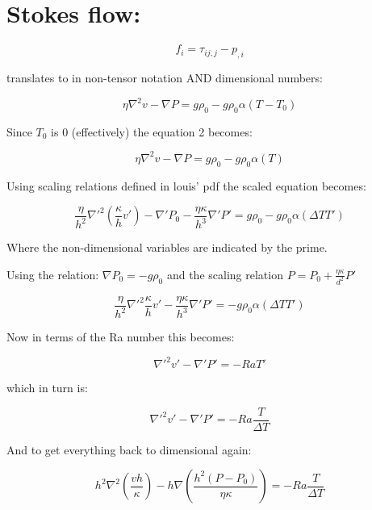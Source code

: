 \documentclass[a4paper]{article}
\begin{document}
\section{Stokes flow:}

\begin{equation}f_i = \tau_{ij,j} - p_{,i}\end{equation}

translates to in non-tensor notation AND dimensional numbers:

\begin{equation}\eta \nabla^2 v - \nabla P =  g \rho_0 - g\rho_0 \alpha(T - T_0)\end{equation} 

Since $T_0$ is 0 (effectively) the equation 2 becomes:

\begin{equation}\eta \nabla^2 v - \nabla P =  g \rho_0 - g\rho_0 \alpha(T)\end{equation} 

Using scaling relations defined in louis' pdf the scaled equation becomes:

\begin{equation}\frac{\eta}{h^2} \nabla'^2 (\frac{\kappa}{h}v') - \nabla' P_0  - \frac{\eta \kappa}{h^3}\nabla' P' =  g \rho_0 - g\rho_0 \alpha(\Delta T T')\end{equation} 

Where the non-dimensional variables are indicated by the prime.

Using the relation: $\nabla P_0 = -g \rho_0$ and the scaling relation $P = P_0 + \frac{\eta \kappa}{d^2}P'$

\begin{equation}\frac{\eta}{h^2} \nabla'^2 \frac{\kappa}{h}v' - \frac{\eta \kappa}{h^3}\nabla' P' =  - g\rho_0 \alpha(\Delta T T')\end{equation} 

Now in terms of the Ra number this becomes:

\begin{equation} \nabla'^2 v' - \nabla' P' =  -RaT'\end{equation} 

which in turn is:

\begin{equation} \nabla'^2 v' - \nabla' P' =  -Ra\frac{T}{\Delta T}\end{equation} 

And to get everything back to dimensional again:

\begin{equation} h^{2} \nabla^2 (\frac{v h}{\kappa}) - h \nabla (\frac{h^2(P - P_0)}{\eta \kappa}) =  -Ra\frac{T}{\Delta T}\end{equation} 
\end{document}
